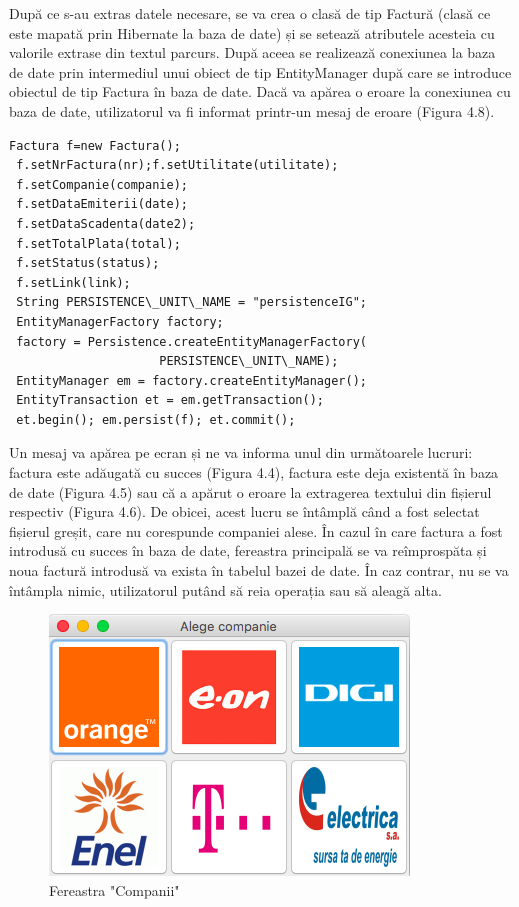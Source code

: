 \documentclass[12pt]{book}
\begin{document}
 După ce s-au extras datele necesare, se va crea o clasă de tip Factură (clasă ce este mapată prin Hibernate la baza de date) și se setează atributele acesteia cu valorile extrase din textul parcurs. După aceea se realizează conexiunea la baza de date prin intermediul unui obiect de tip EntityManager după care se introduce obiectul de tip Factura în baza de date. Dacă va apărea o eroare la conexiunea cu baza de date, utilizatorul va fi informat printr-un mesaj de eroare (Figura 4.8).
 \begin{lstlisting}[frame=single, caption=Introducerea unei facturi în baza de date]
 Factura f=new Factura();
 f.setNrFactura(nr);f.setUtilitate(utilitate);
 f.setCompanie(companie); 
 f.setDataEmiterii(date);
 f.setDataScadenta(date2);
 f.setTotalPlata(total);
 f.setStatus(status);
 f.setLink(link);
 String PERSISTENCE\_UNIT\_NAME = "persistenceIG";
 EntityManagerFactory factory;
 factory = Persistence.createEntityManagerFactory(
					 PERSISTENCE\_UNIT\_NAME);
 EntityManager em = factory.createEntityManager();
 EntityTransaction et = em.getTransaction();
 et.begin(); em.persist(f); et.commit();
 \end{lstlisting}
 
 Un mesaj va apărea pe ecran și ne va informa unul din următoarele lucruri: factura este adăugată cu succes (Figura 4.4), factura este deja existentă în baza de date (Figura 4.5) sau că a apărut o eroare la extragerea textului din fișierul respectiv (Figura 4.6). De obicei, acest lucru se întâmplă când a fost selectat fișierul greșit, care nu corespunde companiei alese. În cazul în care factura a fost introdusă cu succes în baza de date, fereastra principală se va reîmprospăta și noua factură introdusă va exista în tabelul bazei de date. În caz contrar, nu se va întâmpla nimic, utilizatorul putând să reia operația sau să aleagă alta.
\begin{figure}[!ht]
	\centering
	\includegraphics{Companii}
	\caption{Fereastra "Companii"}
\end{figure}
\end{document}
